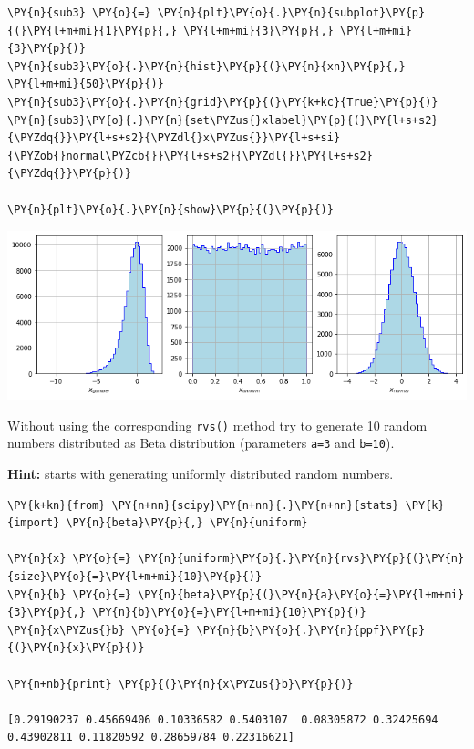 \begin{Answer}
\begin{tcolorbox}[size=fbox, boxrule=1pt, colback=cellbackground, colframe=cellborder]
\begin{Verbatim}[commandchars=\\\{\}]
\PY{n}{sub3} \PY{o}{=} \PY{n}{plt}\PY{o}{.}\PY{n}{subplot}\PY{p}{(}\PY{l+m+mi}{1}\PY{p}{,} \PY{l+m+mi}{3}\PY{p}{,} \PY{l+m+mi}{3}\PY{p}{)}
\PY{n}{sub3}\PY{o}{.}\PY{n}{hist}\PY{p}{(}\PY{n}{xn}\PY{p}{,} \PY{l+m+mi}{50}\PY{p}{)}
\PY{n}{sub3}\PY{o}{.}\PY{n}{grid}\PY{p}{(}\PY{k+kc}{True}\PY{p}{)}
\PY{n}{sub3}\PY{o}{.}\PY{n}{set\PYZus{}xlabel}\PY{p}{(}\PY{l+s+s2}{\PYZdq{}}\PY{l+s+s2}{\PYZdl{}x\PYZus{}}\PY{l+s+si}{\PYZob{}normal\PYZcb{}}\PY{l+s+s2}{\PYZdl{}}\PY{l+s+s2}{\PYZdq{}}\PY{p}{)}
	
\PY{n}{plt}\PY{o}{.}\PY{n}{show}\PY{p}{(}\PY{p}{)}
\end{Verbatim}
\end{tcolorbox}

\begin{center}
\includegraphics{figures/ex_gumbel_to_gauss.png}
\end{center}
\end{Answer}

\begin{Exercise}[title={(Random Numbers)}]
Without using the corresponding \texttt{rvs()} method try to generate 10 random numbers distributed as Beta distribution (parameters \texttt{a=3} and \texttt{b=10}).

\textbf{Hint:} starts with generating uniformly distributed random numbers.
\end{Exercise}	

\begin{Answer}
\begin{tcolorbox}[size=fbox, boxrule=1pt, colback=cellbackground, colframe=cellborder]
\begin{Verbatim}[commandchars=\\\{\}]
\PY{k+kn}{from} \PY{n+nn}{scipy}\PY{n+nn}{.}\PY{n+nn}{stats} \PY{k}{import} \PY{n}{beta}\PY{p}{,} \PY{n}{uniform}
		
\PY{n}{x} \PY{o}{=} \PY{n}{uniform}\PY{o}{.}\PY{n}{rvs}\PY{p}{(}\PY{n}{size}\PY{o}{=}\PY{l+m+mi}{10}\PY{p}{)}
\PY{n}{b} \PY{o}{=} \PY{n}{beta}\PY{p}{(}\PY{n}{a}\PY{o}{=}\PY{l+m+mi}{3}\PY{p}{,} \PY{n}{b}\PY{o}{=}\PY{l+m+mi}{10}\PY{p}{)}
\PY{n}{x\PYZus{}b} \PY{o}{=} \PY{n}{b}\PY{o}{.}\PY{n}{ppf}\PY{p}{(}\PY{n}{x}\PY{p}{)}
		
\PY{n+nb}{print} \PY{p}{(}\PY{n}{x\PYZus{}b}\PY{p}{)}

[0.29190237 0.45669406 0.10336582 0.5403107  0.08305872 0.32425694
0.43902811 0.11820592 0.28659784 0.22316621]
\end{Verbatim}
\end{tcolorbox}
\end{Answer}

